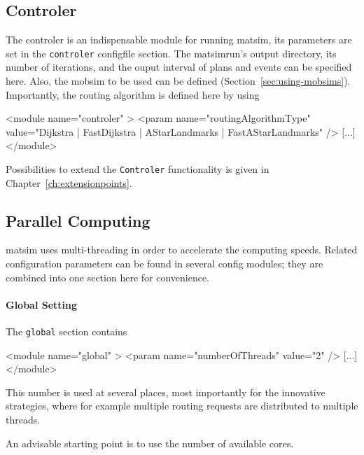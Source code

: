 \subsection{Controler}
\label{sec:using-controler}
The controler is an indispensable module for running \gls{matsim}, its parameters are set in the \lstinline|controler| \gls{configfile} section. The \gls{matsimrun}'s output directory, its number of iterations, and the ouput interval of plans and events can be specified here. Also, the \gls{mobsim} to be used can be defined (Section~\ref{sec:using-mobsims}). Importantly, the routing algorithm is defined here by using
%
\begin{xml}
<module name="controler" >
    <param name="routingAlgorithmType" value="{Dijkstra | FastDijkstra |
    		AStarLandmarks | FastAStarLandmarks}" />
    [...]
</module>
\end{xml}
%
Possibilities to extend the \lstinline|Controler| functionality is given in %
Chapter~\ref{ch:extensionpoints}.

\subsection{Parallel Computing}
\label{sec:using-parallel-computing}

\gls{matsim} uses multi-threading in order to accelerate the computing speeds.  Related configuration parameters can be found in several config modules; they are combined into one section here for convenience.

\paragraph{Global Setting}

The \lstinline{global} section contains
\begin{xml}
<module name="global" >
    <param name="numberOfThreads" value="2" />
    [...]
</module>
\end{xml}
This number is used at several places, most importantly for the innovative strategies, where for example multiple routing requests are distributed to multiple threads.

An advisable starting point is to use the number of available cores.

